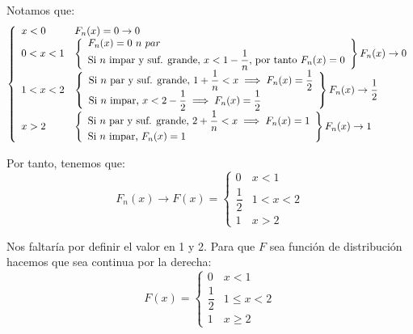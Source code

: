 \documentclass[openany]{book}
\begin{document}
\begin{exercise}
    Notamos que:
    $$ \left\{
    \begin{array}{ll}
        x < 0 &  F_n(x) = 0 \to 0\\ 
        0<x<1 & \left\{
        \begin{array}{l}
            F_n(x) = 0\ n\ par\\ 
            \text{Si $ n $ impar y suf. grande, $ x<1-\dfrac{1}{n} $, por tanto }F_n(x) = 0
        \end{array}
        \right\} F_n(x) \to 0\\ 
        1<x<2 & \left\{
        \begin{array}{l}
            \text{Si $ n $ par y suf. grande, $ 1+\dfrac{1}{n}<x \implies F_n(x)=\dfrac{1}{2} $}\\
            \text{Si $ n $ impar, $ x<2-\dfrac{1}{2} $} \implies F_n(x)=\dfrac{1}{2}
        \end{array}
        \right\} F_n(x) \to \dfrac{1}{2}\\ 
        x>2 & \left\{
        \begin{array}{l}
            \text{Si $ n $ par y suf. grande, $ 2+\dfrac{1}{n}<x $} \implies F_n(x)=1\\ 
            \text{Si $ n $ impar,\ }F_n(x)=1
        \end{array}
        \right\} F_n(x) \to 1

    \end{array}
    \right. $$


    Por tanto, tenemos que:
    $$ F_n(x) \to F(x) = \left\{
    \begin{array}{ll}
        0 & x < 1 \\ 
        \dfrac{1}{2} & 1<x<2 \\ 
        1 & x>2
    \end{array}
    \right. $$

    Nos faltaría por definir el valor en 1 y 2. Para que $ F $ sea función de distribución hacemos que sea continua por la derecha:
$$F(x) = \left\{
    \begin{array}{ll}
        0 & x < 1 \\ 
        \dfrac{1}{2} & 1\leq x<2 \\ 
        1 & x\geq 2
    \end{array}
    \right. $$
    
\end{exercise}
\end{document}
